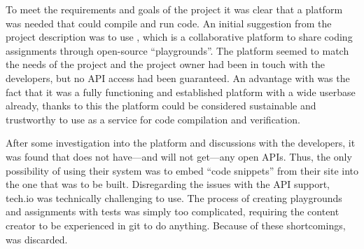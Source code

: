 To meet the requirements and goals of the project it was clear that a platform was needed that could compile and run code. An initial suggestion from the project description was to use \techio{}, which is a collaborative platform to share coding assignments through open-source ``playgrounds''. The platform seemed to match the needs of the project and the project owner had been in touch with the developers, but no API access had been guaranteed. An advantage with \techio{} was the fact that it was a fully functioning and established platform with a wide userbase already, thanks to this the platform could be considered sustainable and trustworthy to use as a service for code compilation and verification.

After some investigation into the platform and discussions with the developers, it was found that \techio{} does not have---and will not get---any open APIs. Thus, the only possibility of using their system was to  embed ``code snippets'' from their site into the one that was to be built. Disregarding the issues with the API support, tech.io was technically challenging to use. The process of creating playgrounds and assignments with tests was simply too complicated, requiring the content creator to be experienced in git to do anything. Because of these shortcomings, \techio{} was discarded.

